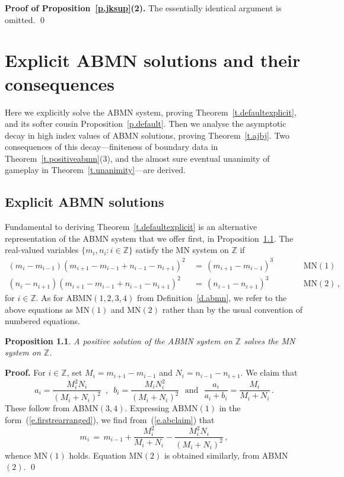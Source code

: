 \documentclass[letterpaper,11pt,oneside,reqno]{amsbook}
\newcommand{\Z}{\ensuremath{\mathbb{Z}}}
\numberwithin{figure}{chapter}
\newtheorem{proposition}[theorem]{Proposition}
\theoremstyle{definition}
\theoremstyle{definition}
\theoremstyle{definition}
\theoremstyle{definition}
\theoremstyle{definition}
\newcommand{\abmnmac}{\textrm{ABMN}}
\newcommand{\mnmac}{\textrm{MN}}
\newcommand{\abmnmacspace}{\textrm{ABMN} }
\newcommand{\mnmacspace}{\textrm{MN} }
\begin{document}
{\bf Proof of  Proposition~\ref{p.jksup}(2).} The essentially identical argument is omitted. \qed
 
   \chapter{Explicit \abmnmacspace solutions and their consequences}\label{c.battlefield}
  
Here we explicitly solve the \abmnmacspace system, proving Theorem~\ref{t.defaultexplicit}, and its softer cousin Proposition~\ref{p.default}.
Then we analyse the asymptotic decay  in high index values of \abmnmacspace solutions, proving Theorem~\ref{t.ajbj}.
Two consequences of this decay---finiteness of boundary data in Theorem~\ref{t.positiveabmn}(3), and 
  the almost sure eventual unanimity of gameplay in Theorem~\ref{t.unanimity}---are derived.

  
  
  \section{Explicit \abmnmacspace solutions}
    
    
    
Fundamental to deriving Theorem~\ref{t.defaultexplicit} is an alternative representation of the \abmnmacspace system that we offer first, in Proposition~\ref{p.abmnsolvesmn}.
    The real-valued variables $\big\{ m_i,n_i: i \in \Z \big\}$ satisfy the \mnmacspace system on $\Z$ if
\begin{align*}
   (m_i - m_{i-1}) (m_{i+1} - m_{i-1} + n_{i-1} - n_{i+1})^2 & \, = \, (m_{i+1} - m_{i-1})^3 && \qquad \textrm{MN}(1) \\
   (n_i - n_{i+1}) (m_{i+1} - m_{i-1} + n_{i-1} - n_{i+1})^2 & \, = \,  (n_{i-1} - n_{i+1})^3 && \qquad \textrm{MN}(2)   \, ,
  \end{align*}
    for $i \in \Z$. As for \abmnmac$(1,2,3,4)$ from Definition~\ref{d.abmn}, we refer to the above equations as  $\textrm{MN}(1)$ and  $\textrm{MN}(2)$
    rather than by the usual convention of numbered equations. 
  \begin{proposition}\label{p.abmnsolvesmn}
  A positive solution of the \abmnmacspace system on $\Z$ solves the \mnmacspace system on $\Z$.
  \end{proposition}
  {\bf Proof.} For $i \in \Z$, set $M_i = m_{i+1} - m_{i-1}$ and $N_i = n_{i-1} - n_{i+1}$. We claim that
  \begin{equation}\label{e.abclaim}
   a_i = \frac{M_i^2 N_i}{(M_i+N_i)^2} \, \, \, , \, \, \,  b_i = \frac{M_i N_i^2}{(M_i+N_i)^2} \, \, \, \, \textrm{and} \, \, \, \, \frac{a_i}{a_i+b_i} =  \frac{M_i}{M_i+N_i} \, .
  \end{equation}
  These follow from \abmnmac$(3,4)$. Expressing \abmnmac$(1)$  in the form~(\ref{e.firstrearranged}),  we find from~(\ref{e.abclaim}) that 
  $$
  m_i \, = \, m_{i-1} +  \frac{M_i^2}{M_i+N_i} -  \frac{M_i^2 N_i}{(M_i+N_i)^2} \, ,
  $$
   whence \mnmac$(1)$ holds. Equation \mnmac$(2)$ is obtained similarly, from \abmnmac$(2)$. \qed
  
\end{document}
